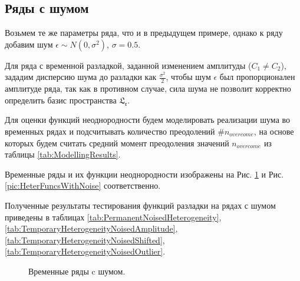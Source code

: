 \documentclass[specialist, substylefile = spbu.rtx,
			   subf, href, 12pt]{disser}
\begin{document}
\newpage
\subsection{Ряды с шумом}
Возьмем те же параметры ряда, что и в предыдущем примере, однако к ряду добавим шум $\epsilon \sim N(0, \sigma^2)$, $\sigma = 0.5$. 

Для ряда с временной разладкой, заданной изменением амплитуды ($C_1 \neq C_2$), зададим дисперсию шума до разладки как $\frac{\sigma^2}{2}$, чтобы шум $\epsilon$ был пропорционален амплитуде ряда, так как в противном случае, сила шума не позволит корректно определить базис пространства $ \mathfrak{L_r} $. 

Для оценки функций неоднородности будем моделировать реализации шума во временных рядах и подсчитывать количество преодолений $\#n_{overcome}$, на основе которых будем считать средний момент преодоления значений $n_{overcome}$ из таблицы \ref{tab:ModellingResults}.

Временные ряды и их функции неоднородности изображены на Рис. \ref{pic:TimeSeriesWithNoise} и Рис. \ref{pic:HeterFuncsWithNoise} соответственно.

Полученные результаты тестирования функций разладки на рядах с шумом приведены в таблицах \ref{tab:PermanentNoisedHeterogeneity}, \ref{tab:TemporaryHeterogeneityNoisedAmplitude}, \ref{tab:TemporaryHeterogeneityNoisedShifted}, \ref{tab:TemporaryHeterogeneityNoisedOutlier}.

\newpage
\begin{figure}[!hhh]
	\caption{Временные ряды c шумом.}
	\label{pic:TimeSeriesWithNoise}
\end{figure}
\end{document}
